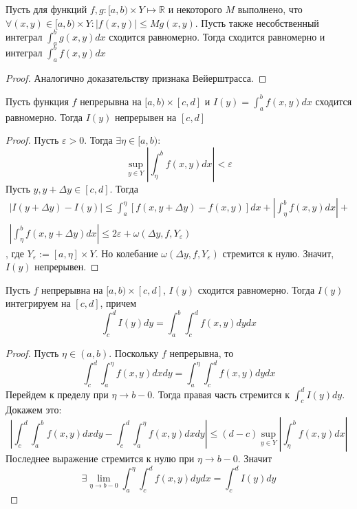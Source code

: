 \documentclass[document.tex]{subfiles}
\begin{document}
\begin{theorem}
    Пусть для функций $f, g: [a, b) \times Y \mapsto \mathbb{R}$ и некоторого $M$ выполнено, что $\forall (x, y) \in [a,
        b) \times Y: |f(x, y)| \leq Mg(x, y)$. Пусть также несобственный интеграл $\int_{a}^{b}g(x, y)dx$ сходится
        равномерно. Тогда сходится равномерно и интеграл $\int_{a}^{b}f(x, y)dx$
\end{theorem}

\begin{proof}
    Аналогично доказательству признака Вейерштрасса.
\end{proof}

\begin{theorem}
    Пусть функция $f$ непрерывна на $[a, b) \times [c, d]$ и $I(y) = \int_{a}^{b}f(x, y)dx$ сходится равномерно. Тогда
    $I(y)$ непрерывен на $[c, d]$
\end{theorem}

\begin{proof}
    Пусть $\varepsilon > 0$. Тогда $\exists \eta \in [a, b)$:
    \[
        \sup_{y \in Y} \left| \int_{\eta}^{b}f(x, y)dx \right| < \varepsilon
    \]
    Пусть $y, y + \Delta y \in [c, d]$. Тогда
    \begin{multline*}
        |I(y + \Delta y) - I(y)| \leq \int_{a}^{\eta} \left[f(x, y + \Delta y) - f(x, y) \right]dx +
        \left| \int_{\eta}^{b}f(x, y)dx \right| + \\
        \left| \int_{\eta}^{b}f(x, y + \Delta y)dx \right|
        \leq
        2 \varepsilon + \omega(\Delta y, f, Y_{\varepsilon})
    \end{multline*}
    , где $Y_{\varepsilon} := [a, \eta] \times Y$. Но колебание $\omega(\Delta y, f, Y_{\varepsilon})$ стремится к нулю.
    Значит, $I(y)$ непрерывен.
\end{proof}

\begin{theorem}
    Пусть $f$ непрерывна на $[a, b) \times [c, d]$, $I(y)$ сходится равномерно.
    Тогда $I(y)$ интегрируем на $[c, d]$, причем
    \[
        \int_{c}^{d}I(y)dy = \int_{a}^{b} \int_{c}^{d}f(x, y)dy dx
    \]
\end{theorem}

\begin{proof}
    Пусть $\eta \in (a, b)$. Поскольку $f$ непрерывна, то
    \[
        \int_{c}^{d} \int_{a}^{\eta}f(x, y)dxdy = \int_{a}^{\eta} \int_{c}^{d}f(x, y)dydx
    \]
    Перейдем к пределу при $\eta \rightarrow b - 0$. Тогда правая часть стремится к $\int_{c}^{d}I(y)dy$. Докажем это:
    \[
        \left| \int_{c}^{d} \int_{a}^{b} f(x, y)dxdy - \int_{c}^{d} \int_{a}^{\eta}f(x, y)dxdy \right| \leq (d - c)
        \sup_{y \in Y} \left| \int_{\eta}^{b}f(x, y)dx \right|
    \]
    Последнее выражение стремится к нулю при $\eta \rightarrow b - 0$. Значит
    \[
        \exists \lim_{\eta \rightarrow b - 0} \int_{a}^{\eta} \int_{c}^{d}f(x, y)dydx = \int_{c}^{d}I(y)dy
    \]
\end{proof}
\end{document}
